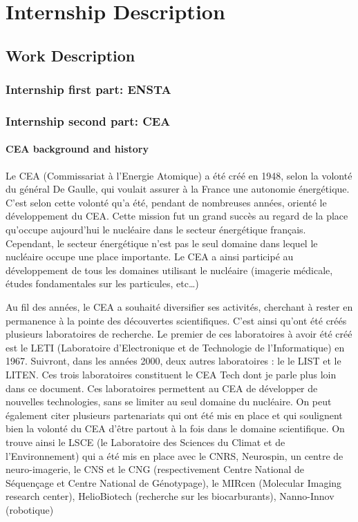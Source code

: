 \part{Internship Description}

\chapter{Work Description}

\section{Internship first part: ENSTA}

\section{Internship second part: CEA}

\subsection{CEA background and history}

Le CEA (Commissariat à l’Energie Atomique) a été créé en 1948, selon la volonté du général De Gaulle, qui voulait assurer à la France une autonomie énergétique.  C’est selon cette volonté qu’a été, pendant de nombreuses années, orienté le développement du CEA. 
Cette mission fut un grand succès au regard de la place qu’occupe aujourd’hui le nucléaire dans le secteur énergétique français. Cependant, le secteur énergétique n’est pas le seul domaine dans lequel le nucléaire occupe une place importante. Le CEA a ainsi participé au développement de tous les domaines utilisant le nucléaire (imagerie médicale, études fondamentales sur les particules, etc…)

Au fil des années, le CEA a souhaité diversifier ses activités, cherchant à rester en permanence à la pointe des découvertes scientifiques.  C’est ainsi qu’ont été créés plusieurs laboratoires de recherche.
Le premier de ces laboratoires à avoir été créé est le LETI (Laboratoire d’Electronique et de Technologie de l’Informatique) en 1967. Suivront, dans les années 2000, deux autres laboratoires : le le LIST et le LITEN. Ces trois laboratoires constituent le CEA Tech dont je parle plus loin dans ce document.
	Ces laboratoires permettent au CEA de développer de nouvelles technologies, sans se limiter au seul domaine du nucléaire. On peut également citer plusieurs partenariats qui ont été mis en place et qui soulignent bien la volonté du CEA d’être partout à la fois dans le domaine scientifique. On trouve ainsi le LSCE (le Laboratoire des Sciences du Climat et de l’Environnement) qui a été mis en place avec le CNRS, Neurospin,  un centre de neuro-imagerie, le CNS et le CNG (respectivement Centre National de Séquençage et Centre National de Génotypage), le MIRcen (Molecular Imaging research center), HelioBiotech (recherche sur les biocarburants), Nanno-Innov (robotique)
	

